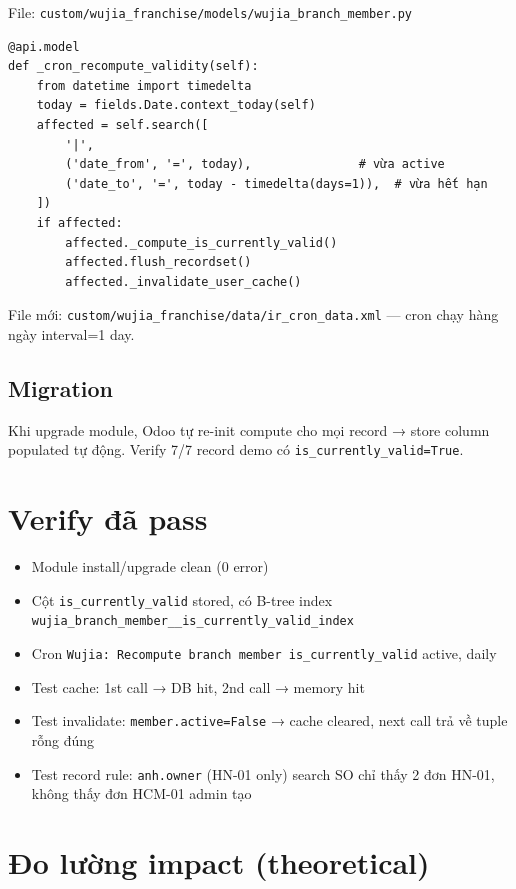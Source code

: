 File: \texttt{custom/wujia\_franchise/models/wujia\_branch\_member.py}

\begin{lstlisting}[style=python]
@api.model
def _cron_recompute_validity(self):
    from datetime import timedelta
    today = fields.Date.context_today(self)
    affected = self.search([
        '|',
        ('date_from', '=', today),               # vừa active
        ('date_to', '=', today - timedelta(days=1)),  # vừa hết hạn
    ])
    if affected:
        affected._compute_is_currently_valid()
        affected.flush_recordset()
        affected._invalidate_user_cache()
\end{lstlisting}

File mới: \texttt{custom/wujia\_franchise/data/ir\_cron\_data.xml} — cron
chạy hàng ngày interval=1 day.

\subsection{Migration}

Khi upgrade module, Odoo tự re-init compute cho mọi record → store column
populated tự động. Verify 7/7 record demo có \texttt{is\_currently\_valid=True}.

\section{Verify đã pass}

\begin{itemize}
    \item Module install/upgrade clean (0 error)
    \item Cột \texttt{is\_currently\_valid} stored, có B-tree index
    \texttt{wujia\_branch\_member\_\_is\_currently\_valid\_index}
    \item Cron \texttt{Wujia: Recompute branch member is\_currently\_valid}
    active, daily
    \item Test cache: 1st call → DB hit, 2nd call → memory hit
    \item Test invalidate: \texttt{member.active=False} → cache cleared,
    next call trả về tuple rỗng đúng
    \item Test record rule: \texttt{anh.owner} (HN-01 only) search SO chỉ
    thấy 2 đơn HN-01, không thấy đơn HCM-01 admin tạo
\end{itemize}

\section{Đo lường impact (theoretical)}

